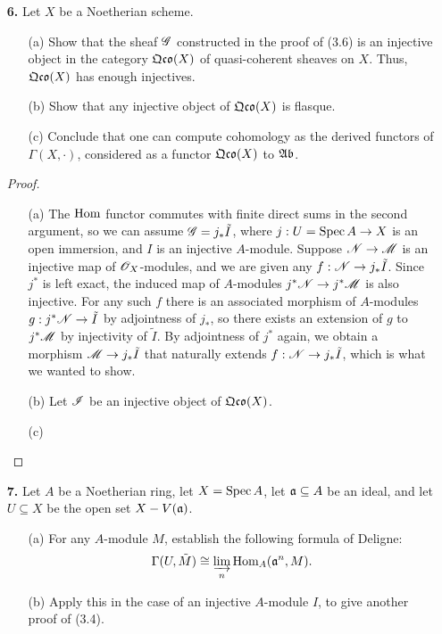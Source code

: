 \documentclass{article}
\begin{document}
\begin{enumerate} [label=\textbf{\arabic*.}, leftmargin=0em]
\begin{proof}
\end{proof}

\item[\textbf{6.}] Let $X$ be a Noetherian scheme.
\begin{itemize}
  \item[(a)] Show that the sheaf $\mathscr{G}$ constructed in the proof of (3.6) is an injective object in the category $\mathfrak{Qco}(X)$ of quasi-coherent sheaves on $X$.
  Thus, $\mathfrak{Qco}(X)$ has enough injectives.

  \item[(b)] Show that any injective object of $\mathfrak{Qco}(X)$ is flasque.

  \item[(c)] Conclude that one can compute cohomology as the derived functors of $\Gamma(X, \cdot)$, considered as a functor $\mathfrak{Qco}(X)$ to $\mathfrak{Ab}$.
\end{itemize}

\begin{proof} $ $ \vspace{0pt}
\begin{itemize} [leftmargin=0cm]
\item[(a)] The $\operatorname{Hom}$ functor commutes with finite direct sums in the second argument, so we can assume $\mathscr{G} = j_* \tilde{I}$, where $j : U = \operatorname{Spec}{A} \to X$ is an open immersion, and $I$ is an injective $A$-module. Suppose $\mathscr{N} \to \mathscr{M}$ is an injective map of $\mathscr{O}_X$-modules, and we are given any $f : \mathscr{N} \to j_*\tilde{I}$. Since $j^*$ is left exact, the induced map of $A$-modules $j^* \mathscr{N} \to j^* \mathscr{M}$ is also injective. For any such $f$ there is an associated morphism of $A$-modules $g : j^* \mathscr{N} \to \tilde{I}$ by adjointness of $j_*$, so there exists an extension of $g$ to $j^*\mathscr{M}$ by injectivity of $\tilde{I}$. By adjointness of $j^*$ again, we obtain a morphism $\mathscr{M} \to j_*\tilde{I}$ that naturally extends $f : \mathscr{N} \to j_*\tilde{I}$, which is what we wanted to show.

\item[(b)] Let $\mathscr{I}$ be an injective object of $\mathfrak{Qco}(X)$.

\item[(c)]
\end{itemize} 
\end{proof}

\item[\textbf{7.}] Let $A$ be a Noetherian ring, let $X = \operatorname{Spec}{A}$, let $\mathfrak{a} \subseteq A$ be an ideal, and let $U \subseteq X$ be the open set $X - V(\mathfrak{a})$.
\begin{itemize}
  \item[(a)] For any $A$-module $M$, establish the following formula of Deligne:
  \begin{equation*}
    \Gamma(U, \tilde{M}) \cong \varinjlim_n{\text{Hom}_A(\mathfrak{a}^n, M)}.
  \end{equation*}
  \item[(b)] Apply this in the case of an injective $A$-module $I$, to give another proof of (3.4).
\end{itemize}


\end{enumerate}
\end{document}
